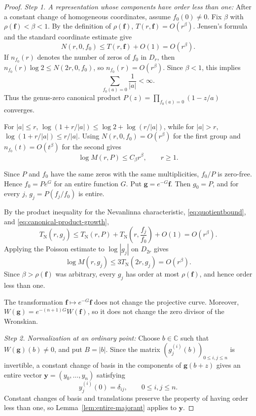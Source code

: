 \documentclass[12pt,letterpaper,reqno]{amsart}
\theoremstyle{definition}
\numberwithin{equation}{section}
\newcommand{\C}{\mathbb C}
\newcommand{\TN}{T_{\mathrm N}}
\newcommand{\fv}{\bm f}
\newcommand{\gv}{\bm g}
\newcommand{\yv}{\bm y}
\begin{document}
\begin{proof}

\medskip\noindent
\emph{{Step 1. A representation whose components have order less than one:}}
After a constant change of homogeneous coordinates, assume
\(f_0(0)\ne0\). Fix
\(\beta\) with \(\rho(\fv)<\beta<1\). By the definition of
\(\rho(\fv)\), \(T(r,\fv)=O(r^\beta)\). Jensen's formula and the
standard coordinate estimate give
\[
 N(r,0,f_0)
 \leq
 T(r,\fv)+O(1)
 =
 O(r^\beta).
\]
If \(n_{f_0}(r)\) denotes the number of zeros of \(f_0\) in \(D_r\),
then
\(n_{f_0}(r)\log2\leq N(2r,0,f_0)\), so
\(n_{f_0}(r)=O(r^\beta)\). Since \(\beta<1\), this implies
\[
 \sum_{f_0(a)=0}\frac1{|a|}<\infty.
\]
Thus the genus-zero canonical product
\(P(z)=\prod_{f_0(a)=0}(1-z/a)\) converges.


For \(|a|\leq r\),
\(\log(1+r/|a|)
 \leq\log2+\log(r/|a|)\), while for \(|a|>r\),
\(\log(1+r/|a|)\leq r/|a|\). Using
\(N(r,0,f_0)=O(r^\beta)\) for the first group and
\(n_{f_0}(t)=O(t^\beta)\) for the second gives
\begin{equation}\label{eq:canonical-product-growth}
 \log M(r,P)\leq C_\beta r^\beta,
 \qquad
 r\geq1.
\end{equation}


Since \(P\) and \(f_0\) have the same zeros with the same
multiplicities, \(f_0/P\) is zero-free. Hence
\(f_0=Pe^G\) for an entire function \(G\). Put
\(\gv=e^{-G}\fv\). Then \(g_0=P\), and for every \(j\),
\(g_j=P(f_j/f_0)\) is entire.

By the product inequality for the Nevanlinna characteristic,
\eqref{eq:quotientbound}, and \eqref{eq:canonical-product-growth},
\[
 \TN(r,g_j)
 \leq
 \TN(r,P)
 +
 \TN\left(r,\frac{f_j}{f_0}\right)
 +O(1)
 =
 O(r^\beta).
\]
Applying the Poisson estimate to \(\log|g_j|\) on \(D_{2r}\) gives
\begin{equation}\label{eq:gauge-component-growth}
 \log M(r,g_j)
 \leq
 3\TN(2r,g_j)
 =
 O(r^\beta).
\end{equation}
Since \(\beta>\rho(\fv)\) was arbitrary, every \(g_j\) has order at
most \(\rho(\fv)\), and hence order less than one.

The transformation \(\fv\mapsto e^{-G}\fv\) does not change the
projective curve. Moreover,
\(W(\gv)=e^{-(n+1)G}W(\fv)\), so it does not change the zero divisor of
the Wronskian.


\medskip\noindent
\emph{{Step 2. Normalization at an ordinary point:}}
Choose \(b\in\C\) such that \(W(\gv)(b)\ne0\), and put \(B=|b|\).
Since the matrix
\((g_j^{(i)}(b))_{0\leq i,j\leq n}\) is invertible, a constant
change of basis in the components of \(\gv(b+z)\) gives an entire
vector
\(\yv=(y_0,\ldots,y_{n})\) satisfying
\[
 y_j^{(i)}(0)=\delta_{ij},
 \qquad
 0\leq i,j\leq n.
\]
Constant changes of basis and translations preserve the property of
having order less than one, so Lemma~\ref{lem:entire-majorant} applies
to \(\yv\).


\end{proof}
\end{document}
